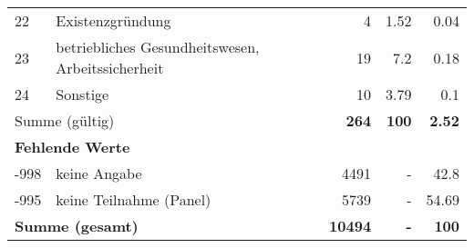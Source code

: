 \begin{longtable}{lXrrr}
        22 & \multicolumn{1}{X}{Existenzgründung} & %
          \num{4} &
          \num[round-mode=places,round-precision=2]{1.52} &
          \num[round-mode=places,round-precision=2]{0.04} \\

        23 & \multicolumn{1}{X}{betriebliches Gesundheitswesen, Arbeitssicherheit} & %
          \num{19} &
          \num[round-mode=places,round-precision=2]{7.2} &
          \num[round-mode=places,round-precision=2]{0.18} \\

        24 & \multicolumn{1}{X}{Sonstige} & %
          \num{10} &
          \num[round-mode=places,round-precision=2]{3.79} &
          \num[round-mode=places,round-precision=2]{0.1} \\

     \midrule
     \multicolumn{2}{l}{Summe (gültig)} &
       \textbf{\num{264}} &
     \textbf{\num{100}} &
       \textbf{\num[round-mode=places,round-precision=2]{2.52}} \\
     \multicolumn{5}{l}{\textbf{Fehlende Werte}}\\
       -998 &
       keine Angabe &
         \num{4491} &
        - &
         \num[round-mode=places,round-precision=2]{42.8} \\
       -995 &
       keine Teilnahme (Panel) &
         \num{5739} &
        - &
         \num[round-mode=places,round-precision=2]{54.69} \\
     \midrule
     \multicolumn{2}{l}{\textbf{Summe (gesamt)}} &
          \textbf{\num{10494}} &
        \textbf{-} &
        \textbf{\num{100}} \\
     \bottomrule
     \end{longtable}
     
